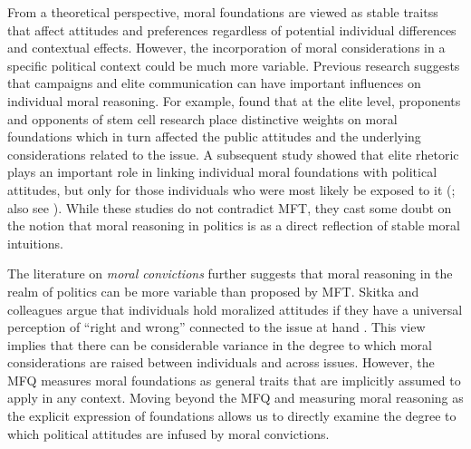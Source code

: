 \documentclass[12pt]{article}
\begin{document}
From a theoretical perspective, moral foundations are viewed as stable traitss that affect attitudes and preferences regardless of potential individual differences and contextual effects. However, the incorporation of moral considerations in a specific political context could be much more variable. Previous research suggests that campaigns and elite communication can have important influences on individual moral reasoning. For example, \citet{clifford2013words} found that at the elite level, proponents and opponents of stem cell research place distinctive weights on moral foundations which in turn affected the public attitudes and the underlying considerations related to the issue. A subsequent study showed that elite rhetoric plays an important role in linking individual moral foundations with political attitudes, but only for those individuals who were most likely be exposed to it (\citealt{clifford2015concerns}; also see \citealt{day2014shifting}). While these studies do not contradict MFT, they cast some doubt on the notion that moral reasoning in politics is as a direct reflection of stable moral intuitions. 

The literature on \textit{moral convictions} further suggests that moral reasoning in the realm of politics can be more variable than proposed by MFT. Skitka and colleagues argue that individuals hold moralized attitudes if they have a universal perception of ``right and wrong'' connected to the issue at hand \citep{skitka2005moral,mullen2006exploring,skitka2010psychology}. This view implies that there can be considerable variance in the degree to which moral considerations are raised between individuals and across issues. However, the MFQ measures moral foundations as general traits that are implicitly assumed to apply in any context. Moving beyond the MFQ and measuring moral reasoning as the explicit expression of foundations allows us to directly examine the degree to which political attitudes are infused by moral convictions.
\end{document}
